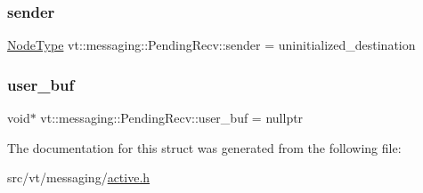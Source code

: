 \mbox{\label{structvt_1_1messaging_1_1_pending_recv_a7bf339cd65c0b4caad259825eb7861d5}} 
\subsubsection{\texorpdfstring{sender}{sender}}
{\footnotesize\ttfamily \hyperlink{namespacevt_a866da9d0efc19c0a1ce79e9e492f47e2}{Node\+Type} vt\+::messaging\+::\+Pending\+Recv\+::sender = uninitialized\+\_\+destination}

\mbox{\label{structvt_1_1messaging_1_1_pending_recv_a18d11f650583c3da5a7362e0c998be5d}} 
\subsubsection{\texorpdfstring{user\+\_\+buf}{user\_buf}}
{\footnotesize\ttfamily void$\ast$ vt\+::messaging\+::\+Pending\+Recv\+::user\+\_\+buf = nullptr}



The documentation for this struct was generated from the following file\+:\begin{DoxyCompactItemize}
\item 
src/vt/messaging/\hyperlink{active_8h}{active.\+h}\end{DoxyCompactItemize}
